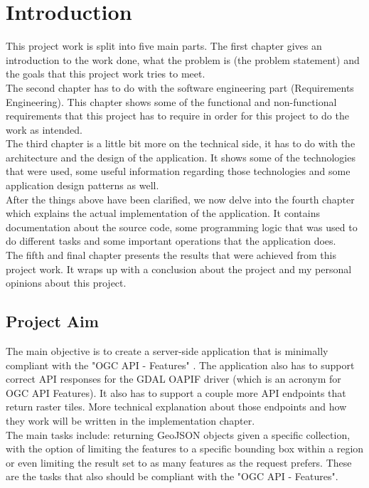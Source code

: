 \chapter{Introduction}
This project work is split into five main parts. 
The first chapter gives an introduction to the work done, what the problem is (the problem statement) and the goals that this project work tries to meet.\\
\newline
The second chapter has to do with the software engineering part (Requirements Engineering). This chapter shows some of the functional and non-functional requirements that this project has to require in order for this project to do the work as intended.\\
\newline
The third chapter is a little bit more on the technical side, it has to do with the architecture and the design of the application. It shows some of the technologies that were used, some useful information regarding those technologies and some application design patterns as well.\\
\newline
After the things above have been clarified, we now delve into the fourth chapter which explains the actual implementation of the application. It contains documentation about the source code, some programming logic that was used to do different tasks and some important operations that the application does.\\
\newline
The fifth and final chapter presents the results that were achieved from this project work. It wraps up with a conclusion about the project and my personal opinions about this project.
\newpage
\section{Project Aim}
The main objective is to create a server-side application that is minimally compliant with the "OGC API - Features" \cite{OGCApiFeatures}. The application also has to support correct API responses for the GDAL OAPIF \cite{OAPIF} driver (which is an acronym for OGC API Features). It also has to support a couple more API endpoints that return raster tiles. More technical explanation about those endpoints and how they work will be written in the implementation chapter.\\
\newline
The main tasks include: returning GeoJSON objects given a specific collection, with the option of limiting the features to a specific bounding box within a region or even limiting the result set to as many features as the request prefers. These are the tasks that also should be compliant with the "OGC API - Features".

